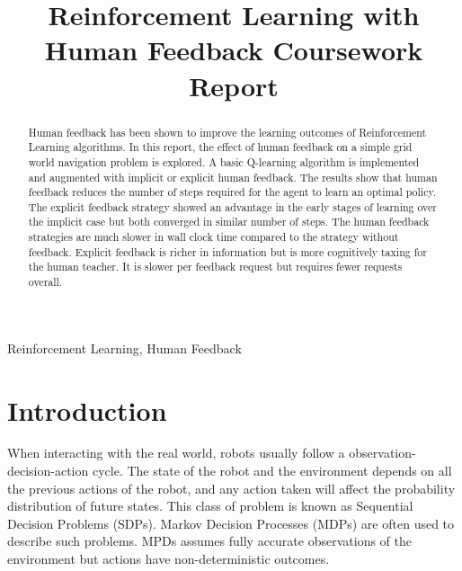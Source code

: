\documentclass[conference]{IEEEtran}
\begin{document}
\title{Reinforcement Learning with Human Feedback Coursework Report}

\author{
}

\maketitle

\begin{abstract}
Human feedback has been shown to improve the learning outcomes of Reinforcement Learning algorithms. In this report, the effect of human feedback on a simple grid world navigation problem is explored. A basic Q-learning algorithm is implemented and augmented with implicit or explicit human feedback. The results show that human feedback reduces the number of steps required for the agent to learn an optimal policy. The explicit feedback strategy showed an advantage in the early stages of learning over the implicit case but both converged in similar number of steps. The human feedback strategies are much slower in wall clock time compared to the strategy without feedback. Explicit feedback is richer in information but is more cognitively taxing for the human teacher. It is slower per feedback request but requires fewer requests overall.
\end{abstract}

\begin{IEEEkeywords}
    Reinforcement Learning, Human Feedback
\end{IEEEkeywords}

\section{Introduction}

When interacting with the real world, robots usually follow a observation-decision-action cycle. The state of the robot and the environment depends on all the previous actions of the robot, and any action taken will affect the probability distribution of future states. This class of problem is known as Sequential Decision Problems (SDPs). Markov Decision Processes (MDPs) \cite{putermanMarkovDecisionProcesses2014} are often used to describe such problems. MPDs assumes fully accurate observations of the environment but actions have non-deterministic outcomes.
\end{document}
